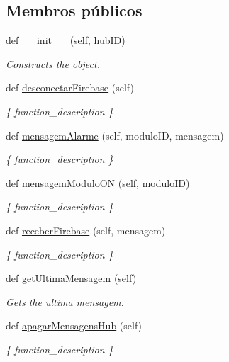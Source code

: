\subsection*{Membros públicos}
\begin{DoxyCompactItemize}
\item 
def \hyperlink{classhub_para_firebase_1_1_hub_para_firebase_a8553e4a8f4a5564e69a1ebac33e255b3}{\+\_\+\+\_\+init\+\_\+\+\_\+} (self, hub\+ID)
\begin{DoxyCompactList}\small\item\em Constructs the object. \end{DoxyCompactList}\item 
def \hyperlink{classhub_para_firebase_1_1_hub_para_firebase_a8867ea8f38db645837f1c0ab0a4b207e}{desconectar\+Firebase} (self)
\begin{DoxyCompactList}\small\item\em \{ function\+\_\+description \} \end{DoxyCompactList}\item 
def \hyperlink{classhub_para_firebase_1_1_hub_para_firebase_aec0b9ed7691e78978716075fe999019a}{mensagem\+Alarme} (self, modulo\+ID, mensagem)
\begin{DoxyCompactList}\small\item\em \{ function\+\_\+description \} \end{DoxyCompactList}\item 
def \hyperlink{classhub_para_firebase_1_1_hub_para_firebase_a269bab1a9f98ad3ef1ac4a0f31a59a57}{mensagem\+Modulo\+ON} (self, modulo\+ID)
\begin{DoxyCompactList}\small\item\em \{ function\+\_\+description \} \end{DoxyCompactList}\item 
def \hyperlink{classhub_para_firebase_1_1_hub_para_firebase_aab4023d0316ce43f1ed743aa6d02064e}{receber\+Firebase} (self, mensagem)
\begin{DoxyCompactList}\small\item\em \{ function\+\_\+description \} \end{DoxyCompactList}\item 
def \hyperlink{classhub_para_firebase_1_1_hub_para_firebase_a8c00d07d181c47e4567b602947466abe}{get\+Ultima\+Mensagem} (self)
\begin{DoxyCompactList}\small\item\em Gets the ultima mensagem. \end{DoxyCompactList}\item 
def \hyperlink{classhub_para_firebase_1_1_hub_para_firebase_a434ba152fb00900dddfaf2f61e5d78b6}{apagar\+Mensagens\+Hub} (self)
\begin{DoxyCompactList}\small\item\em \{ function\+\_\+description \} \end{DoxyCompactList}\end{DoxyCompactItemize}
